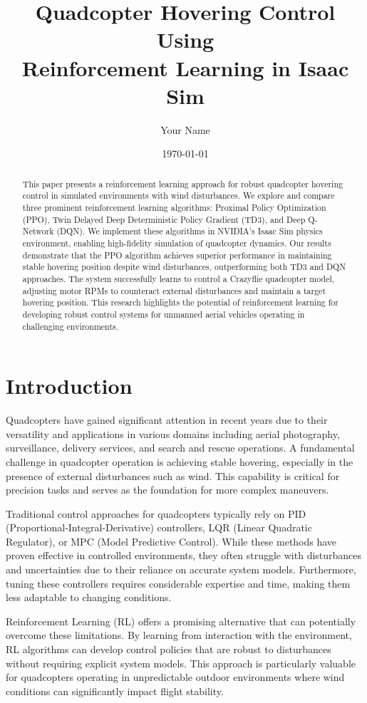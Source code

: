\documentclass[12pt]{article}
\title{Quadcopter Hovering Control Using\\Reinforcement Learning in Isaac Sim}
\author{Your Name}
\date{\today}
\begin{document}
\maketitle

\begin{abstract}
This paper presents a reinforcement learning approach for robust quadcopter hovering control in simulated environments with wind disturbances. We explore and compare three prominent reinforcement learning algorithms: Proximal Policy Optimization (PPO), Twin Delayed Deep Deterministic Policy Gradient (TD3), and Deep Q-Network (DQN). We implement these algorithms in NVIDIA's Isaac Sim physics environment, enabling high-fidelity simulation of quadcopter dynamics. Our results demonstrate that the PPO algorithm achieves superior performance in maintaining stable hovering position despite wind disturbances, outperforming both TD3 and DQN approaches. The system successfully learns to control a Crazyflie quadcopter model, adjusting motor RPMs to counteract external disturbances and maintain a target hovering position. This research highlights the potential of reinforcement learning for developing robust control systems for unmanned aerial vehicles operating in challenging environments.
\end{abstract}

\section{Introduction}
Quadcopters have gained significant attention in recent years due to their versatility and applications in various domains including aerial photography, surveillance, delivery services, and search and rescue operations. A fundamental challenge in quadcopter operation is achieving stable hovering, especially in the presence of external disturbances such as wind. This capability is critical for precision tasks and serves as the foundation for more complex maneuvers.

Traditional control approaches for quadcopters typically rely on PID (Proportional-Integral-Derivative) controllers, LQR (Linear Quadratic Regulator), or MPC (Model Predictive Control). While these methods have proven effective in controlled environments, they often struggle with disturbances and uncertainties due to their reliance on accurate system models. Furthermore, tuning these controllers requires considerable expertise and time, making them less adaptable to changing conditions.

Reinforcement Learning (RL) offers a promising alternative that can potentially overcome these limitations. By learning from interaction with the environment, RL algorithms can develop control policies that are robust to disturbances without requiring explicit system models. This approach is particularly valuable for quadcopters operating in unpredictable outdoor environments where wind conditions can significantly impact flight stability.
\end{document}

